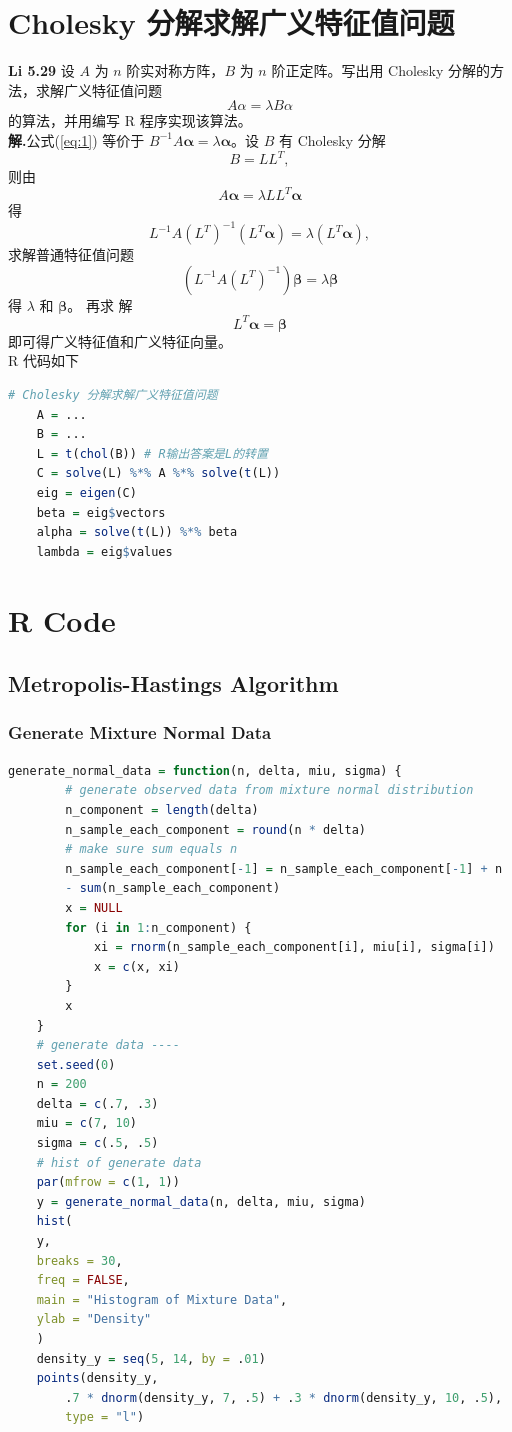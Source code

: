 \documentclass[11pt]{article}
\begin{document}
\section{Cholesky 分解求解广义特征值问题}
\textbf{Li 5.29 }设 $A$ 为 $n$ 阶实对称方阵，$B$ 为 $n$ 阶正定阵。写出用 Cholesky 分解的方法，求解广义特征值问题 
\begin{equation}\label{eq:1}
    A \alpha= \lambda B \alpha
\end{equation}
的算法，并用编写 $\mathrm{R}$ 程序实现该算法。\\
\textbf{解.}公式(\ref{eq:1}) 等价于 $B^{-1} A \boldsymbol{\alpha}=\lambda \boldsymbol{\alpha}$。设 $B$ 有 Cholesky 分解 $$B=L L^{T},$$ 则由 $$A \boldsymbol{\alpha}=\lambda L L^{T} \boldsymbol{\alpha}$$ 得 $$L^{-1} A\left(L^{T}\right)^{-1}\left(L^{T} \boldsymbol{\alpha}\right)=\lambda\left(L^{T} \boldsymbol{\alpha}\right),$$ 求解普通特征值问题 $$\left(L^{-1} A\left(L^{T}\right)^{-1}\right) \boldsymbol{\beta}=\lambda \boldsymbol{\beta}$$ 得 $\lambda$ 和 $\boldsymbol{\beta}$。 再求
解 $$L^{T} \boldsymbol{\alpha}=\boldsymbol{\beta}$$ 即可得广义特征值和广义特征向量。\\
R 代码如下
\begin{lstlisting}[language=R]
    # Cholesky 分解求解广义特征值问题
    A = ...
    B = ...
    L = t(chol(B)) # R输出答案是L的转置
    C = solve(L) %*% A %*% solve(t(L))
    eig = eigen(C)
    beta = eig$vectors
    alpha = solve(t(L)) %*% beta
    lambda = eig$values
\end{lstlisting}

\section{R Code}
\subsection{Metropolis-Hastings Algorithm}\label{sec:mh}
\subsubsection{Generate Mixture Normal Data}\label{sec:mhgen}
\begin{lstlisting}[language=R] 
    generate_normal_data = function(n, delta, miu, sigma) {
        # generate observed data from mixture normal distribution
        n_component = length(delta)
        n_sample_each_component = round(n * delta)
        # make sure sum equals n
        n_sample_each_component[-1] = n_sample_each_component[-1] + n 
        - sum(n_sample_each_component)
        x = NULL
        for (i in 1:n_component) {
            xi = rnorm(n_sample_each_component[i], miu[i], sigma[i])
            x = c(x, xi)
        }
        x
    }
    # generate data ----
    set.seed(0)
    n = 200
    delta = c(.7, .3)
    miu = c(7, 10)
    sigma = c(.5, .5)
    # hist of generate data
    par(mfrow = c(1, 1))
    y = generate_normal_data(n, delta, miu, sigma)
    hist(
    y,
    breaks = 30,
    freq = FALSE,
    main = "Histogram of Mixture Data",
    ylab = "Density"
    )
    density_y = seq(5, 14, by = .01)
    points(density_y,
        .7 * dnorm(density_y, 7, .5) + .3 * dnorm(density_y, 10, .5),
        type = "l")
\end{lstlisting}
\end{document}
